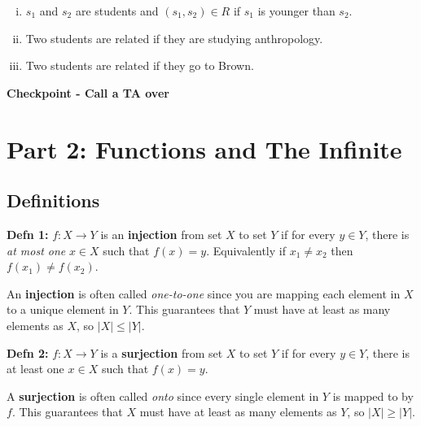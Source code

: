 \documentclass[12pt,letterpaper]{article}
\newif\ifsol
\newcommand{\solu}[2]{ \begin{mdframed} \ifsol #2 \else \vspace{#1} \fi \end{mdframed} }
\begin{document}
\begin{enumerate}[a.]
\begin{enumerate}[i.]
				\solu{3cm}{Reflexive, symmetric, and transitive. Therefore equivelance relation. Equivelance classes are students of each age. }


			\item$s_1$ and $s_2$ are students and $(s_1,s_2) \in R$ if $s_1$ is younger than $s_2$.

				\solu{3cm}{Transitive but not reflexive or symmetric.}

		\item Two students are related if they are studying anthropology.
		
				\solu{3cm}{Symmetric and transitive but not reflexive}


	  	\item Two students are related if they go to Brown.


				\solu{3cm}{Reflexive, symmetric, and transitive. Therefore equivelance relation. One equivelance class which consists of all students at Brown.}
	
		\end{enumerate}

	\end{enumerate}

\textbf{Checkpoint - Call a TA over}
\newpage

	\section*{Part 2: Functions and The Infinite}

      \subsection*{Definitions}

      \textbf{Defn 1:} $f : X \rightarrow Y$ is an \textbf{injection} from set $X$ to set $Y$ if for every $y \in Y$, there is \textit{at most one} $x \in X$ such that $f(x) = y$. Equivalently if $x_1 \not= x_2$ then $f(x_1) \not= f(x_2)$.

      An \textbf{injection} is often called \textit{one-to-one} since you are mapping each element in $X$ to a unique element in $Y$. This guarantees that $Y$ must have at least as many elements as $X$, so $|X| \leq |Y|$.

      \textbf{Defn 2:} $f : X \rightarrow Y$ is a \textbf{surjection} from set $X$ to set $Y$ if for every $y \in Y$, there is at least one $x \in X$ such that $f(x) = y$. 

      A \textbf{surjection} is often called \textit{onto} since every single element in $Y$ is mapped to by $f$. This guarantees that $X$ must have at least as many elements as $Y$, so $|X| \geq |Y|$.
\end{document}
